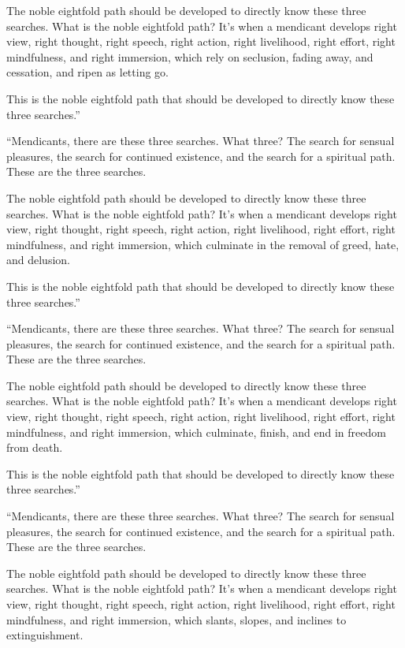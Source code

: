 \documentclass[12pt,openany]{book}%
\begin{document}
The noble eightfold path should be developed to directly know these three searches. What is the noble eightfold path? It’s when a mendicant develops right view, right thought, right speech, right action, right livelihood, right effort, right mindfulness, and right immersion, which rely on seclusion, fading away, and cessation, and ripen as letting go. 

This is the noble eightfold path that should be developed to directly know these three searches.” 

“Mendicants, there are these three searches. What three? The search for sensual pleasures, the search for continued existence, and the search for a spiritual path. These are the three searches. 

The noble eightfold path should be developed to directly know these three searches. What is the noble eightfold path? It’s when a mendicant develops right view, right thought, right speech, right action, right livelihood, right effort, right mindfulness, and right immersion, which culminate in the removal of greed, hate, and delusion. 

This is the noble eightfold path that should be developed to directly know these three searches.” 

“Mendicants, there are these three searches. What three? The search for sensual pleasures, the search for continued existence, and the search for a spiritual path. These are the three searches. 

The noble eightfold path should be developed to directly know these three searches. What is the noble eightfold path? It’s when a mendicant develops right view, right thought, right speech, right action, right livelihood, right effort, right mindfulness, and right immersion, which culminate, finish, and end in freedom from death. 

This is the noble eightfold path that should be developed to directly know these three searches.” 

“Mendicants, there are these three searches. What three? The search for sensual pleasures, the search for continued existence, and the search for a spiritual path. These are the three searches. 

The noble eightfold path should be developed to directly know these three searches. What is the noble eightfold path? It’s when a mendicant develops right view, right thought, right speech, right action, right livelihood, right effort, right mindfulness, and right immersion, which slants, slopes, and inclines to extinguishment. 
\end{document}
